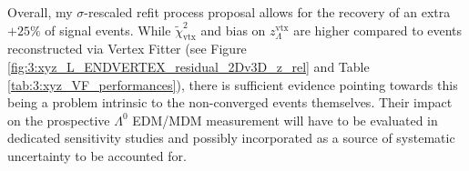 Overall, my $\sigma$-rescaled refit process proposal allows for the recovery of an extra $+25\%$ of signal events.
While $\tilde{\chi}^2_\text{vtx}$ and bias on $z_\Lambda^\text{vtx}$ are higher compared to events reconstructed via Vertex Fitter (see Figure \ref{fig:3:xyz_L_ENDVERTEX_residual_2Dv3D_z_rel} and Table \ref{tab:3:xyz_VF_performances}), there is sufficient evidence pointing towards this being a problem intrinsic to the non-converged events themselves.
Their impact on the prospective $\Lambda^0$ EDM/MDM measurement will have to be evaluated in dedicated sensitivity studies and possibly incorporated as a source of systematic uncertainty to be accounted for.

